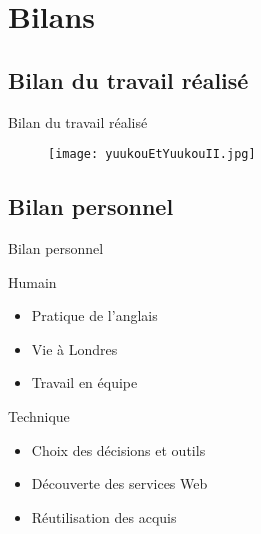 \section{Bilans}

\subsection{Bilan du travail r\'ealis\'e}

\begin{frame}{Bilan du travail r\'ealis\'e}
%			
%			
%			
%		
	\begin{figure}[h]
		\texttt{[image: yuukouEtYuukouII.jpg]}
	
	\end{figure}
	
\end{frame}


\subsection{Bilan personnel}

\begin{frame}{Bilan personnel}
	\begin{block}{Humain}
		\begin{itemize}
			\item Pratique de l'anglais
			\item Vie \`a Londres
			\item Travail en \'equipe
			
		\end{itemize}
		
	\end{block}
	
	\begin{block}{Technique}
		\begin{itemize}
			\item Choix des d\'ecisions et outils
			\item D\'ecouverte des services Web
			\item R\'eutilisation des acquis
			
		\end{itemize}
		
	\end{block}

\end{frame}